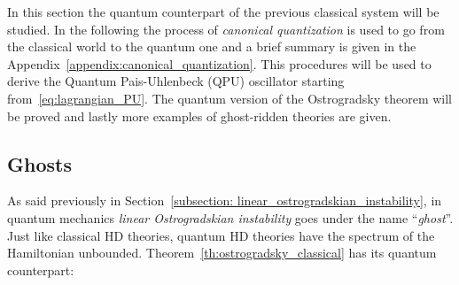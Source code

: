 In this section the quantum counterpart of the previous classical system will be
studied. In the following the process of \emph{canonical quantization} is used
to go from the classical world to the quantum one and a brief summary is given
in the Appendix~\ref{appendix:canonical_quantization}. This procedures will be
used to derive the Quantum Pais-Uhlenbeck (QPU) oscillator starting
from~\eqref{eq:lagrangian_PU}. The quantum version of the Ostrogradsky theorem
will be proved and lastly more examples of ghost-ridden theories are given.

\subsection{Ghosts}\label{section:ghosts}
As said previously in Section~\ref{subsection:
linear_ostrogradskian_instability}, in quantum mechanics \emph{linear
Ostrogradskian instability} goes under the name ``\emph{ghost}''. Just like
classical HD theories, quantum HD theories have the spectrum of the Hamiltonian
unbounded. Theorem~\ref{th:ostrogradsky_classical} has its quantum counterpart:

